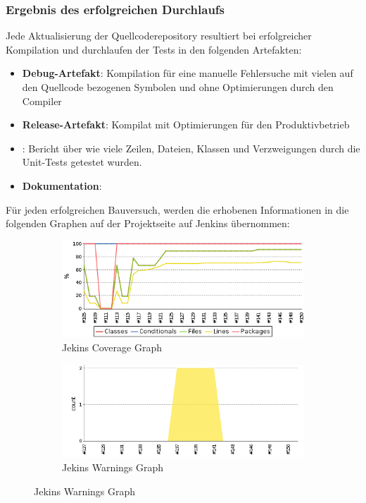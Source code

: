 \subsubsection{Ergebnis des erfolgreichen Durchlaufs}
Jede Aktualisierung der Quellcoderepository resultiert bei erfolgreicher Kompilation und durchlaufen der Tests in den folgenden Artefakten:
\begin{itemize}
	\item \textbf{Debug-Artefakt}: Kompilation für eine manuelle Fehlersuche mit vielen auf den Quellcode bezogenen Symbolen und ohne Optimierungen durch den Compiler
	\item \textbf{Release-Artefakt}: Kompilat mit Optimierungen für den Produktivbetrieb
	\item \textbf{}: Bericht über wie viele Zeilen, Dateien, Klassen und Verzweigungen durch die Unit-Tests getestet wurden.
	\item \textbf{Dokumentation}: 
\end{itemize}

Für jeden erfolgreichen Bauversuch, werden die erhobenen Informationen in die folgenden Graphen auf der Projektseite auf Jenkins übernommen:

\begin{figure}[H]
	\centering
	\begin{subfigure}{.5\textwidth}
		\includegraphics[width=\textwidth]{images/jenkins_coverage_graph.png}
		\caption{Jekins Coverage Graph}
		\label{impl:jenkins:coverage:graph}
	\end{subfigure}%
	\begin{subfigure}{.5\textwidth}
		\includegraphics[width=\textwidth]{images/jenkins_warnings_graph.png}
		\caption{Jekins Warnings Graph}
		\label{impl:jenkins:warnings:graph}
	\end{subfigure}
\end{figure}

